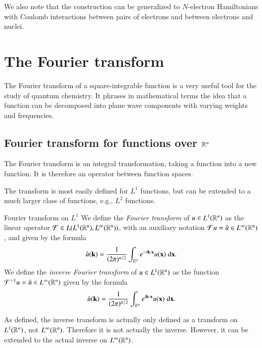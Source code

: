 We also note that the construction can be generalized to $N$-electron Hamiltonians with Coulomb interactions between pairs of electrons and between electrons and nuclei. 

\section{The Fourier transform}

The Fourier transform of a square-integrable function is a very useful tool for the study of quantum chemistry. It phrases in mathematical terms the idea that a function can be decomposed into plane wave components with varying weights and frequencies.

\subsection{Fourier transform for functions over $\mathbb{R}^n$}

\newcommand{\fconst}{\frac{1}{(2\pi)^{n/2}}}

The Fourier transform is an integral transformation, taking a function into a new function. It is therefore an operator between function spaces.

The transform is most easily defined for $L^1$ functions, but can be extended to a much larger class of functions, e.g., $L^2$ functions. 

\begin{myDefinition}{Fourier transform on $L^1$}{}
    We define the \emph{Fourier transform} of $u \in L^1(\mathbb{R}^n)$ as the linear operator $\mathcal{F} \in L(L^1(\mathbb{R}^n), L^\infty(\mathbb{R}^n))$, with an auxiliary notation $\mathcal{F}u = \hat{u} \in L^\infty(\mathbb{R}^n)$, and given by the formula
    \begin{equation}
        \hat{u}(\bvec{k}) = \fconst \int_{\RR^n} e^{-\rmi \bvec{k}\cdot\bvec{x}} u(\bvec{x})\; \rmd \bvec{x}. \label{eq:fourier-transform}
    \end{equation}
    We define the \emph{inverse Fourier transform} of $u \in L^1(\mathbb{R}^n)$ as the function $\mathcal{F}^{-1}u = \check{u} \in L^\infty(\mathbb{R}^n)$ given by the formula
    \begin{equation}
        \check{u}(\bvec{k}) = \fconst \int_{\RR^n} e^{\rmi \bvec{k}\cdot\bvec{x}} u(\bvec{x})\; \rmd \bvec{x}. \label{eq:inverse-fourier-transform}
    \end{equation}    
\end{myDefinition}
As defined, the inverse transform is actually only defined as a transform on $L^1(\mathbb{R}^n)$, not $L^\infty(\mathbb{R}^n)$. Therefore it is not actually the inverse. However, it can be extended to the actual inverse on $L^\infty(\mathbb{R}^n)$.

